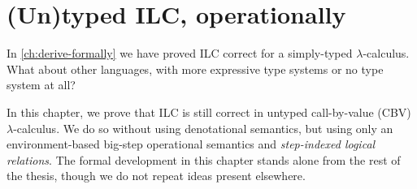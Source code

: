 









\def\deriveDefCore{%
\begin{align*}
  \ensuremath{\Derive{\lambda (\Varid{x}\typcolon\sigma)\to \Varid{t}}} &= \ensuremath{\lambda (\Varid{x}\typcolon\sigma)\;(\Varid{dx}\typcolon\Delta \sigma)\to \Derive{\Varid{t}}} \\
  \ensuremath{\Derive{\Varid{s}\;\Varid{t}}} &= \ensuremath{\Derive{\Varid{s}}\;\Varid{t}\;\Derive{\Varid{t}}} \\
  \ensuremath{\Derive{\Varid{x}}} &= \ensuremath{\Varid{dx}} \\
  \ensuremath{\Derive{\Varid{c}}} &= \ensuremath{\DeriveConst{\Varid{c}}}
\end{align*}
}




\chapter{(Un)typed ILC, operationally}
\label{ch:bsos}

In \cref{ch:derive-formally} we have proved ILC correct for a
simply-typed $\lambda$-calculus. What about other languages, with more expressive
type systems or no type system at all?

In this chapter, we prove that ILC is still correct in untyped
call-by-value (CBV) $\lambda$-calculus. We do so without using
denotational semantics, but using only an environment-based
big-step operational semantics and \emph{step-indexed logical
relations}. The formal development in this chapter stands alone
from the rest of the thesis, though we do not repeat ideas
present elsewhere.

